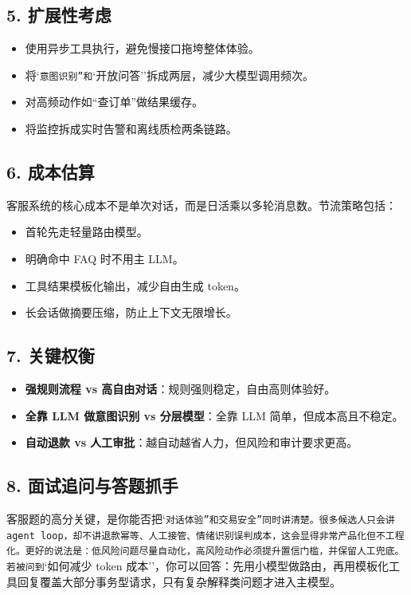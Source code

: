 \subsection{5. 扩展性考虑}
\begin{itemize}[leftmargin=2em]
\item 使用异步工具执行，避免慢接口拖垮整体体验。
\item 将`\texttt{意图识别''和}`开放问答''拆成两层，减少大模型调用频次。
\item 对高频动作如``查订单''做结果缓存。
\item 将监控拆成实时告警和离线质检两条链路。
\end{itemize}

\subsection{6. 成本估算}
客服系统的核心成本不是单次对话，而是日活乘以多轮消息数。节流策略包括：

\begin{itemize}[leftmargin=2em]
\item 首轮先走轻量路由模型。
\item 明确命中 FAQ 时不用主 LLM。
\item 工具结果模板化输出，减少自由生成 token。
\item 长会话做摘要压缩，防止上下文无限增长。
\end{itemize}

\subsection{7. 关键权衡}
\begin{itemize}[leftmargin=2em]
\item \textbf{强规则流程 vs 高自由对话}：规则强则稳定，自由高则体验好。
\item \textbf{全靠 LLM 做意图识别 vs 分层模型}：全靠 LLM 简单，但成本高且不稳定。
\item \textbf{自动退款 vs 人工审批}：越自动越省人力，但风险和审计要求更高。
\end{itemize}

\subsection{8. 面试追问与答题抓手}
客服题的高分关键，是你能否把`\texttt{对话体验''和}\texttt{交易安全''同时讲清楚。很多候选人只会讲 agent loop，却不讲退款幂等、人工接管、情绪识别误判成本，这会显得非常产品化但不工程化。更好的说法是：低风险问题尽量自动化，高风险动作必须提升置信门槛，并保留人工兜底。若被问到}`如何减少 token 成本''，你可以回答：先用小模型做路由，再用模板化工具回复覆盖大部分事务型请求，只有复杂解释类问题才进入主模型。


